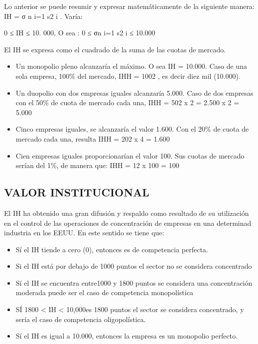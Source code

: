 \documentclass[
  letterpaper,
  DIV=11,
  numbers=noendperiod]{scrartcl}
\begin{document}
Lo anterior se puede resumir y expresar matemáticamente de la siguiente
manera: IH = σ n i=1 s2 i . Varía:

0 ≤ IH ≤ 10. 000, O sea : 0 ≤ σn i=1 s2 i ≤ 10.000

El IH se expresa como el cuadrado de la suma de las cuotas de mercado.

\begin{itemize}
\item
  Un monopolio pleno alcanzaría el máximo. O sea IH = 10.000. Caso de
  una sola empresa, 100\% del mercado, IHH = 1002 , es decir diez mil
  (10.000).
\item
  Un duopolio con dos empresas iguales alcanzaría 5.000. Caso de dos
  empresas con el 50\% de cuota de mercado cada una, IHH = 502 x 2 =
  2.500 x 2 = 5.000
\item
  Cinco empresas iguales, se alcanzaría el valor 1.600. Con el 20\% de
  cuota de mercado cada una, resulta IHH = 202 x 4 = 1.600
\item
  Cien empresas iguales proporcionarían el valor 100. Sus cuotas de
  mercado serían del 1\%, de manera que: IHH = 12 x 100 = 100
\end{itemize}

\hypertarget{valor-institucional}{%
\subsection{VALOR INSTITUCIONAL}\label{valor-institucional}}

El IH ha obtenido una gran difusión y respaldo como resultado de su
utilización en el control de las operaciones de concentración de
empresas en una determinad industria en los EEUU. En este sentido se
tiene que:

\begin{itemize}
\item
  Sí el IH tiende a cero (0), entonces es de competencia perfecta.
\item
  Si el IH está por debajo de 1000 puntos el sector no se considera
  concentrado
\item
  Sí el IH se encuentra entre1000 y 1800 puntos se considera una
  concentración moderada puede ser el caso de competencia monopolística
\item
  SÍ 1800 \textless{} IH \textless{} 10,000es 1800 puntos el sector se
  considera concentrado, y sería el caso de competencia oligopolística.
\item
  Sí el IH es igual a 10.000, entonces la empresa es un monopolio
  perfecto.
\end{itemize}
\end{document}
